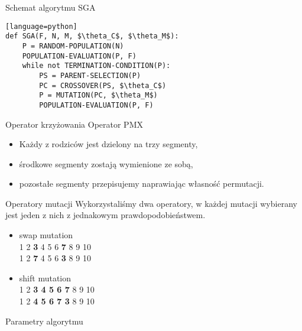 \begin{frame}[fragile]
\begin{block}{Schemat algorytmu SGA}
\begin{lstlisting}[mathescape][language=python]
def SGA(F, N, M, $\theta_C$, $\theta_M$):
    P = RANDOM-POPULATION(N)
    POPULATION-EVALUATION(P, F)
    while not TERMINATION-CONDITION(P):
        PS = PARENT-SELECTION(P)
        PC = CROSSOVER(PS, $\theta_C$)
        P = MUTATION(PC, $\theta_M$)
        POPULATION-EVALUATION(P, F)
\end{lstlisting}
\end{block}
\end{frame}

\begin{frame}[fragile]
\begin{block}{Operator krzyżowania}
Operator PMX
\begin{itemize}
\item Każdy z rodziców jest dzielony na trzy segmenty,
\item środkowe segmenty zostają wymienione ze sobą,
\item pozostałe segmenty przepisujemy naprawiając własność permutacji.
\end{itemize}
\end{block}
\end{frame}

\begin{frame}[fragile]
\begin{block}{Operatory mutacji}
Wykorzystaliśmy dwa operatory, w każdej mutacji wybierany jest jeden z nich z jednakowym prawdopodobieństwem.
\begin{itemize}
\item swap mutation \\
1 2 \textbf{3} 4 5 6 \textbf{7} 8 9 10 \\
1 2 \textbf{7} 4 5 6 \textbf{3} 8 9 10 \\
\item shift mutation \\ 
1 2 \textbf{3 4 5 6 7} 8 9 10 \\
1 2 \textbf{4 5 6 7 3} 8 9 10 \\
\end{itemize}
\end{block}
\end{frame}

\begin{frame}[fragile]
\begin{block}{Parametry algorytmu}
\end{block}
\end{frame}
